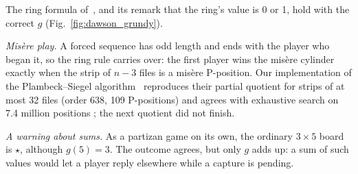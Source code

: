 The ring formula of~\cite{Study2025}, and its remark that the ring's value is 0 or 1, hold with the
correct $g$ (Fig.~\ref{fig:dawson_grundy}).

\emph{Mis\`ere play.} A forced sequence has odd length and ends with the player who began it, so the
ring rule carries over: the first player wins the mis\`ere cylinder exactly when the strip of $n-3$ files is
a mis\`ere P-position. Our implementation of the Plambeck--Siegel algorithm~\cite{PlambeckSiegel2008}
reproduces their partial quotient for strips of at most 32 files (order 638, 109 P-positions) and agrees
with exhaustive search on 7.4 million positions ; the next quotient did not finish.

\emph{A warning about sums.} As a partizan game on its own, the ordinary $3\times5$ board is $\star$,
although $g(5)=3$. The outcome agrees, but only $g$ adds up: a sum of such values would let a player reply
elsewhere while a capture is pending.
